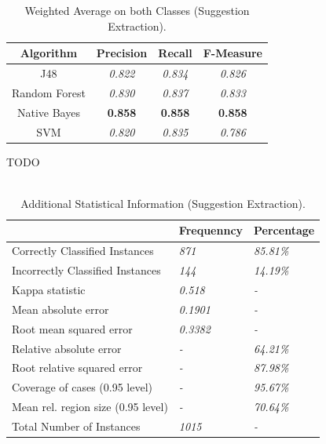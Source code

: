 \begin{table}[H]
\centering
\caption{Weighted Average on both Classes (Suggestion Extraction).}
\label{47_table_ref}
\begin{tabular}{cccc}
\hline
{\bf Algorithm} & {\bf Precision} & {\bf Recall} & {\bf F-Measure} \\ \hline
J48             & {\it 0.822}     & {\it 0.834}  & {\it 0.826}     \\
Random Forest   & {\it 0.830}      & {\it 0.837}  & {\it 0.833}     \\
Native Bayes    & {\bf 0.858}     & {\bf 0.858}  & {\bf 0.858}     \\
SVM             & {\it 0.820}      & {\it 0.835}  & {\it 0.786}     \\ \hline
\end{tabular}
\end{table}

TODO\\
\\

\begin{table}[H]
\centering
\caption{Additional Statistical Information (Suggestion Extraction).}
\label{48_table_rer}
\begin{tabular}{lll}
\hline
                                   & {\bf Frequenncy} & {\bf Percentage} \\ \hline
Correctly Classified Instances     & {\it 871}        & {\it 85.81\%}    \\
Incorrectly Classified Instances   & {\it 144}        & {\it 14.19\%}    \\
Kappa statistic                    & {\it 0.518}      & {\it -}          \\
Mean absolute error                & {\it 0.1901}     & {\it -}          \\
Root mean squared error            & {\it 0.3382}     & {\it -}          \\
Relative absolute error            & {\it -}          & {\it 64.21\%}    \\
Root relative squared error        & {\it -}          & {\it 87.98\%}    \\
Coverage of cases (0.95 level)     & {\it -}          & {\it 95.67\%}    \\
Mean rel. region size (0.95 level) & {\it -}          & {\it 70.64\%}    \\
Total Number of Instances          & {\it 1015}       & {\it -}          \\ \hline
\end{tabular}
\end{table}



